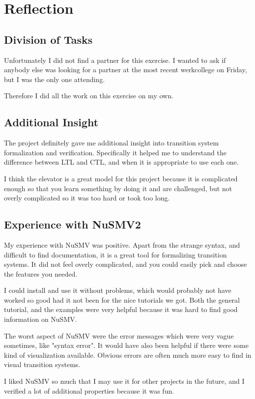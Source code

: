 \documentclass[12pt, a4paper]{article}
\begin{document}
\section{Reflection}
\subsection{Division of Tasks}
Unfortunately I did not find a partner for this exercise. I wanted to ask if anybody else was looking for a partner at the most recent werkcollege on Friday, but I was the only one attending.

Therefore I did all the work on this exercise on my own.

\subsection{Additional Insight}
The project definitely gave me additional insight into transition system formalization and verification. Specifically it helped me to understand the difference between LTL and CTL, and when it is appropriate to use each one.

I think the elevator is a great model for this project because it is complicated enough so that you learn something by doing it and are challenged, but not overly complicated so it was too hard or took too long.

\subsection{Experience with NuSMV2}
My experience with NuSMV was positive. Apart from the strange syntax, and difficult to find documentation, it is a great tool for formalizing transition systems. It did not feel overly complicated, and you could easily pick and choose the features you needed.

I could install and use it without problems, which would probably not have worked so good had it not been for the nice tutorials we got. Both the general tutorial, and the examples were very helpful because it was hard to find good information on NuSMV.

The worst aspect of NuSMV were the error messages which were very vague sometimes, like "syntax error". It would have also been helpful if there were some kind of visualization available. Obvious errors are often much more easy to find in visual transition systems.

I liked NuSMV so much that I may use it for other projects in the future, and I verified a lot of additional properties because it was fun.
\end{document}
